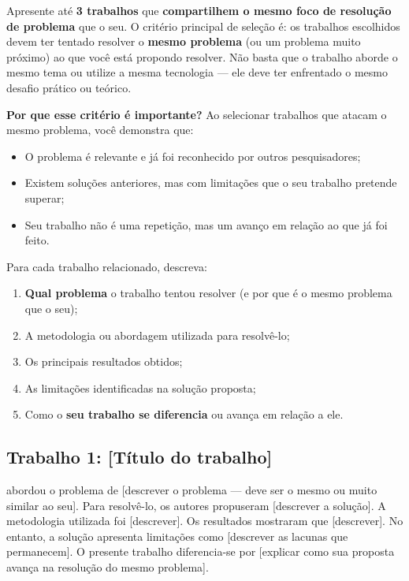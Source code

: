 \documentclass[
    12pt,                %
    openright,           %
    oneside,             %
    a4paper,             %
    english,             %
    brazil               %
]{abntex2}
\begin{document}
Apresente até \textbf{3 trabalhos} que \textbf{compartilhem o mesmo foco de resolução de problema} que o seu. O critério principal de seleção é: os trabalhos escolhidos devem ter tentado resolver o \textbf{mesmo problema} (ou um problema muito próximo) ao que você está propondo resolver. Não basta que o trabalho aborde o mesmo tema ou utilize a mesma tecnologia --- ele deve ter enfrentado o mesmo desafio prático ou teórico.

\textbf{Por que esse critério é importante?} Ao selecionar trabalhos que atacam o mesmo problema, você demonstra que:
\begin{itemize}
    \item O problema é relevante e já foi reconhecido por outros pesquisadores;
    \item Existem soluções anteriores, mas com limitações que o seu trabalho pretende superar;
    \item Seu trabalho não é uma repetição, mas um avanço em relação ao que já foi feito.
\end{itemize}

Para cada trabalho relacionado, descreva:
\begin{enumerate}
    \item \textbf{Qual problema} o trabalho tentou resolver (e por que é o mesmo problema que o seu);
    \item A metodologia ou abordagem utilizada para resolvê-lo;
    \item Os principais resultados obtidos;
    \item As limitações identificadas na solução proposta;
    \item Como o \textbf{seu trabalho se diferencia} ou avança em relação a ele.
\end{enumerate}

\subsection{Trabalho 1: [Título do trabalho]}

 abordou o problema de [descrever o problema --- deve ser o mesmo ou muito similar ao seu]. Para resolvê-lo, os autores propuseram [descrever a solução]. A metodologia utilizada foi [descrever]. Os resultados mostraram que [descrever]. No entanto, a solução apresenta limitações como [descrever as lacunas que permanecem]. O presente trabalho diferencia-se por [explicar como sua proposta avança na resolução do mesmo problema].
\end{document}
